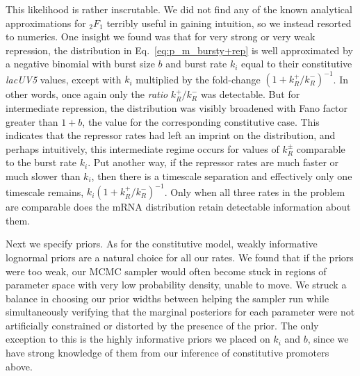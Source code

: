 This likelihood is rather inscrutable. We did not find any of the
known analytical approximations for ${_2F_1}$ terribly useful in
gaining intuition, so we instead resorted to numerics. One insight we found
was that for very strong or very weak repression, the distribution in
Eq.~\ref{eq:p_m_bursty+rep} is well approximated by a negative binomial
with burst size $b$ and burst rate $k_i$ equal to their
constitutive \textit{lacUV5} values, except with $k_i$ multiplied
by the fold-change $\left(1+k_R^+/k_R^-\right)^{-1}$.
In other words, once again only the \textit{ratio} $k_R^+/k_R^-$
was detectable. But for intermediate repression, the distribution
was visibly broadened with Fano factor greater than $1+b$, the
value for the corresponding constitutive case. This indicates
that the repressor rates had left an imprint on the distribution,
and perhaps intuitively, this intermediate regime occurs for values of
$k_R^\pm$ comparable to the burst rate $k_i$. Put another way,
if the repressor rates are much faster or much slower than $k_i$,
then there is a timescale separation and effectively only one
timescale remains, $k_i\left(1+k_R^+/k_R^-\right)^{-1}$.
Only when all three rates in the problem are comparable does the
mRNA distribution retain detectable information about them.

Next we specify priors. As for the constitutive model, weakly
informative lognormal priors are a natural choice for all our
rates. We found that if the priors were too weak, our MCMC
sampler would often become stuck in regions of parameter space
with very low probability density, unable to move. We struck a
balance in choosing our prior widths between helping the sampler
run while simultaneously verifying that the marginal posteriors
for each parameter were not artificially constrained or distorted
by the presence of the prior. The only exception to this is the
highly informative priors we placed on $k_i$ and $b$, since we
have strong knowledge of them from our inference of constitutive
promoters above.

